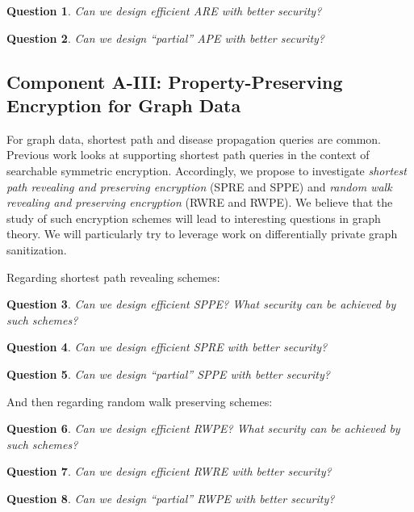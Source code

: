 \documentclass[11pt]{article}
\newtheorem{question}{Question}[section]
\theoremstyle{remark}
\begin{document}
\begin{question}
Can we design efficient ARE with better security?
\end{question}

\begin{question}
Can we design ``partial'' APE with better security?
\end{question}

\subsection{Component A-III:  Property-Preserving Encryption for Graph Data} 

For graph data, shortest path and disease propagation queries are common.  Previous work looks at supporting shortest path queries in the context of searchable symmetric encryption.  Accordingly, we propose to investigate \emph{shortest path revealing  and preserving encryption} (SPRE and SPPE) and \emph{random walk revealing and preserving encryption} (RWRE and RWPE).   We believe that the study of such encryption schemes will lead to interesting questions in graph theory.  We will particularly try to leverage work on differentially private graph sanitization. 

Regarding shortest path revealing schemes: 

\begin{question}
Can we design efficient SPPE?  What security can be achieved by such schemes?
\end{question}


\begin{question}
Can we design efficient SPRE with better security?
\end{question}

\begin{question}
Can we design ``partial'' SPPE with better security?
\end{question}

And then regarding random walk preserving schemes:

\begin{question}
Can we design efficient RWPE?  What security can be achieved by such schemes?
\end{question}


\begin{question}
Can we design efficient RWRE with better security?
\end{question}

\begin{question}
Can we design ``partial'' RWPE with better security?
\end{question}
\fi
\end{document}

